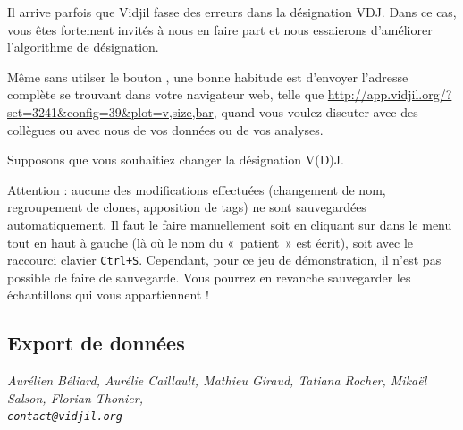 \documentclass[10pt]{article}
\begin{document}
\bigskip

Il arrive parfois que Vidjil fasse des erreurs dans la désignation VDJ.
Dans ce cas, vous êtes fortement invités à nous en faire part et nous
essaierons d'améliorer l'algorithme de désignation.


Même sans utilser le bouton , une bonne habitude est
d'envoyer l'adresse complète se trouvant dans votre navigateur web,
telle que \url{http://app.vidjil.org/?set=3241&config=39&plot=v,size,bar},
quand vous voulez discuter avec des collègues ou avec nous de vos données
ou de vos analyses.

\bigskip

Supposons que vous souhaitiez
changer la désignation V(D)J.



Attention : aucune des modifications effectuées (changement de nom,
regroupement de clones, apposition de tags) ne sont sauvegardées
automatiquement.
Il faut le faire manuellement soit en cliquant sur  dans le
menu tout en haut à gauche (là où le nom du «~patient~» est écrit), soit avec
le raccourci clavier \texttt{Ctrl+S}.
Cependant, pour ce jeu de démonstration, il n'est pas possible de faire de
sauvegarde. Vous pourrez en revanche sauvegarder les échantillons qui vous
appartiennent !

\subsection{Export de données}





\vfill
\flushright \it Aurélien Béliard, Aurélie Caillault, Mathieu Giraud, Tatiana Rocher, Mikaël Salson, Florian Thonier, 
\\ \texttt{contact@vidjil.org}
\end{document}

